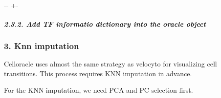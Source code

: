 \documentclass[letterpaper,10pt,english]{sphinxmanual}
\newlength\nbsphinxcodecellspacing
\begin{document}
{

\kern-\sphinxverbatimsmallskipamount\kern-\baselineskip
\kern+\FrameHeightAdjust\kern-\fboxrule
\vspace{\nbsphinxcodecellspacing}

\begin{sphinxVerbatim}[commandchars=\\\{\}]

\end{sphinxVerbatim}
}


\subparagraph{2.3.2. Add TF informatio dictionary into the oracle object}
\label{\detokenize{notebooks/04_Network_analysis/Network_analysis_with_Paul_etal_2015_data:2.3.2.-Add-TF-informatio-dictionary-into-the-oracle-object}}
{
\begin{sphinxVerbatim}[commandchars=\\\{\}]
\llap{\color{nbsphinxin}[53]:\,\hspace{\fboxrule}\hspace{\fboxsep}}
\end{sphinxVerbatim}
}


\subsubsection{3. Knn imputation}
\label{\detokenize{notebooks/04_Network_analysis/Network_analysis_with_Paul_etal_2015_data:3.-Knn-imputation}}
Celloracle uses almost the same strategy as velocyto for visualizing cell transitions. This process requires KNN imputation in advance.

For the KNN imputation, we need PCA and PC selection first.
\end{document}
